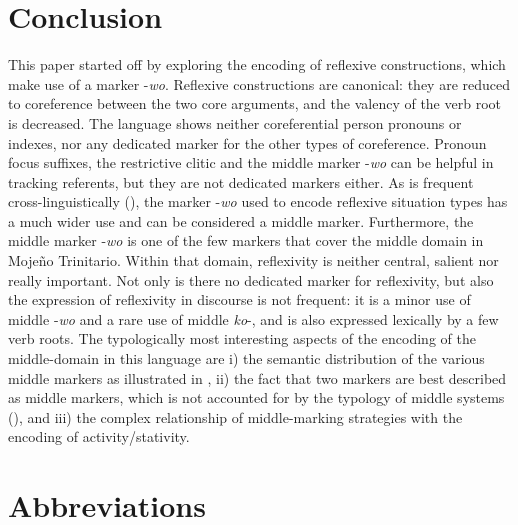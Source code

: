 \documentclass[output=paper]{langscibook}
\begin{document}
\section{Conclusion}
\label{sec:Rose:7}

This paper started off by exploring the encoding of reflexive constructions, which make use of a marker -\textit{wo}. Reflexive constructions are canonical: they are reduced to coreference between the two core arguments, and the valency of the verb root is decreased. The language shows neither coreferential person pronouns or indexes, nor any dedicated marker for the other types of coreference. Pronoun focus suffixes, the restrictive clitic and the middle marker -\textit{wo} can be helpful in tracking referents, but they are not dedicated markers either. As is frequent cross-linguistically (\citealt{Kemmer1993}), the marker -\textit{wo} used to encode reflexive situation types has a much wider use and can be considered a middle marker. Furthermore, the middle marker -\textit{wo} is one of the few markers that cover the middle domain in Mojeño Trinitario. Within that domain, reflexivity is neither central, salient nor really important. Not only is there no dedicated marker for reflexivity, but also the expression of reflexivity in discourse is not frequent: it is a minor use of middle -\textit{wo} and a rare use of middle \textit{ko}-, and is also expressed lexically by a few verb roots. The typologically most interesting aspects of the encoding of the middle-domain in this language are i) the semantic distribution of the various middle markers as illustrated in , ii) the fact that two markers are best described as middle markers, which is not accounted for by the typology of middle systems (\citealt{Kemmer1993}), and iii) the complex relationship of middle-marking strategies with the encoding of activity/stativity.



\section*{Abbreviations}
\end{document}
